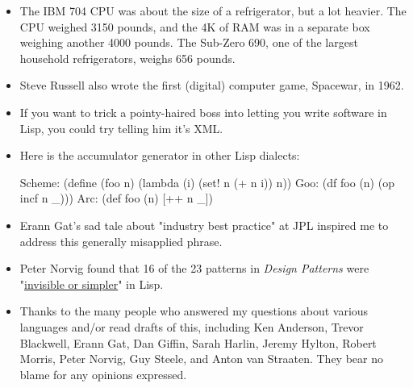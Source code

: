                   \begin{itemize}
\item 
                      The IBM 704 CPU was about the size of a refrigerator, but
                      a lot heavier. The CPU weighed 3150 pounds, and the 4K of
                      RAM was in a separate box weighing another 4000 pounds.
                      The Sub-Zero 690, one of the largest household
                      refrigerators, weighs 656 pounds.


                    
\item 
                      Steve Russell also wrote the first (digital) computer
                      game, Spacewar, in 1962.


                    
\item 
                      If you want to trick a pointy-haired boss into letting you
                      write software in Lisp, you could try telling him it's
                      XML.


                    
\item 
                      Here is the accumulator generator in other Lisp dialects:
                      
                        
Scheme: (define (foo n) 
          (lambda (i) (set! n (+ n i)) n))
Goo:    (df foo (n) (op incf n \_)))
Arc:    (def foo (n) [++ n \_])

                      
                    
\item 
                      Erann Gat's sad tale about "industry best practice" at JPL
                      inspired me to address this generally misapplied
                      phrase.


                    
\item 
                      Peter Norvig found that 16 of the 23 patterns in
                      \emph{Design Patterns} were "\href{http://www.norvig.com/design-patterns/}{invisible or simpler}" in Lisp.


                    
\item 
                      Thanks to the many people who answered my questions about
                      various languages and/or read drafts of this, including
                      Ken Anderson, Trevor Blackwell, Erann Gat, Dan Giffin,
                      Sarah Harlin, Jeremy Hylton, Robert Morris, Peter Norvig,
                      Guy Steele, and Anton van Straaten. They bear no blame for
                      any opinions expressed.


                    
\end{itemize}

